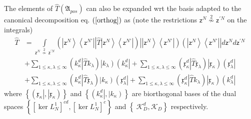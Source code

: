 \documentclass[aps,preprint]{revtex4}%
\begin{document}
The elements of $\hat{T}\left(  \mathfrak{A}_{pos}\right)  $ can also be
expanded wrt the basis adapted to the canonical decomposition eq. $\left(
\ref{orthog}\right)  $ as (note the restrictions $\mathsf{z}^{N}\overset
{2}{\nsim}\mathsf{z}^{\prime N}$ on the integrals)
\begin{align}
\hat{T}  &  =%
{\displaystyle\int\limits_{\mathsf{z}^{N}\overset{2}{\,\nsim\,}\mathsf{z}%
^{\prime N}}}
\left(  \left\vert \mathsf{z}^{N}\right\rangle \left\langle \mathsf{z}%
^{N\prime}\right\vert \left\vert \hat{T}\right.  \left\vert \mathsf{z}%
^{N}\right\rangle \left\langle \mathsf{z}^{N\prime}\right\vert \right)
\left\vert \overset{}{}\left\vert \mathsf{z}^{N}\right\rangle \left\langle
\mathsf{z}^{N\prime}\right\vert \right)  \left(  \overset{}{}\left\vert
\mathsf{z}^{N}\right\rangle \left\langle \mathsf{z}^{N\prime}\right\vert
\right\vert d\mathsf{z}^{N}d\mathsf{z}^{\prime N}\nonumber\\
&  +%
{\displaystyle\sum\limits_{1\leq\kappa,\lambda\leq\infty}}
\left(  k_{\kappa}^{d}\left\vert \hat{T}\right.  k_{\lambda}\right)
\left\vert k_{\lambda}\right)  \left(  k_{\kappa}^{d}\right\vert +%
{\displaystyle\sum\limits_{1\leq\kappa,\lambda\leq\infty}}
\left(  \mathfrak{x}_{\kappa}^{d}\left\vert \hat{T}\right.  \mathfrak{x}%
_{\lambda}\right)  \left\vert \mathfrak{x}_{\kappa}\right)  \left(
\mathfrak{x}_{\lambda}^{d}\right\vert \nonumber\\
&  +%
{\displaystyle\sum\limits_{1\leq\kappa,\lambda\leq\infty}}
\left(  k_{\kappa}^{d}\left\vert \hat{T}\right.  \mathfrak{x}_{\lambda
}\right)  \left\vert k_{\kappa}\right)  \left(  \mathfrak{x}_{\lambda}%
^{d}\right\vert +%
{\displaystyle\sum\limits_{1\leq\kappa,\lambda\leq\infty}}
\left(  \mathfrak{x}_{\kappa}^{d}\left\vert \hat{T}\right.  k_{\lambda
}\right)  \left\vert \mathfrak{x}_{\kappa}\right)  \left(  k_{\lambda}%
^{d}\right\vert
\end{align}
where $\left\{  \left(  \mathfrak{x}_{\kappa}\right\vert ,\left\vert
\mathfrak{x}_{\kappa}\right)  \right\}  $ and $\left\{  \left(  k_{\kappa}%
^{d}\right\vert ,\left\vert k_{\kappa}\right)  \right\}  $ are biorthogonal
bases of the dual spaces $\left\{  \left[  \ker L_{N}^{1}\right]
^{cd},\left[  \ker L_{N}^{1}\right]  ^{c}\right\}  $ and $\left\{
\ \mathcal{K}_{D}^{d},\mathcal{K}_{D}\right\}  $ respectively.
\end{document}
